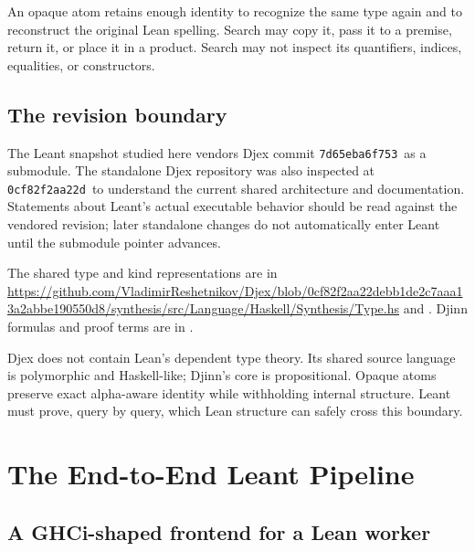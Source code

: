 \documentclass[10pt,letterpaper,oneside,openany]{report}
\newcommand{\DjexCommit}{\texttt{0cf82f2aa22d}}
\newcommand{\DjexPinnedCommit}{\texttt{7d65eba6f753}}
\begin{document}
\begin{keyidea}
An opaque atom retains enough identity to recognize the same type again and to reconstruct the original Lean spelling.  Search may copy it, pass it to a premise, return it, or place it in a product.  Search may not inspect its quantifiers, indices, equalities, or constructors.
\end{keyidea}

\section{The revision boundary}

The Leant snapshot studied here vendors Djex commit \DjexPinnedCommit\ as a submodule.  The standalone Djex repository was also inspected at \DjexCommit\ to understand the current shared architecture and documentation.  Statements about Leant's actual executable behavior should be read against the vendored revision; later standalone changes do not automatically enter Leant until the submodule pointer advances.

\begin{sourcebox}
The shared type and kind representations are in \url{https://github.com/VladimirReshetnikov/Djex/blob/0cf82f2aa22debb1de2c7aaa13a2abbe190550d8/synthesis/src/Language/Haskell/Synthesis/Type.hs} and .  Djinn formulas and proof terms are in .
\end{sourcebox}

\begin{recapbox}
Djex does not contain Lean's dependent type theory.  Its shared source language is polymorphic and Haskell-like; Djinn's core is propositional.  Opaque atoms preserve exact alpha-aware identity while withholding internal structure.  Leant must prove, query by query, which Lean structure can safely cross this boundary.
\end{recapbox}

\chapter{The End-to-End Leant Pipeline}\label{ch:pipeline}

\section{A GHCi-shaped frontend for a Lean worker}
\end{document}
